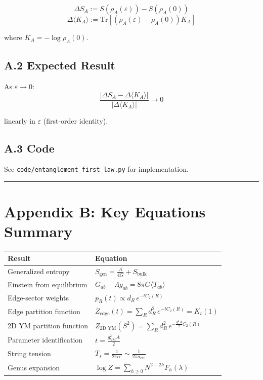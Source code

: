 \[\Delta S_A := S(\rho_A(\varepsilon)) - S(\rho_A(0))\] \[\Delta\langle K_A \rangle := \text{Tr}[(\rho_A(\varepsilon) - \rho_A(0)) K_A]\]

where \(K_A = -\log \rho_A(0)\).

\subsection{A.2 Expected Result}\label{a2-expected-result}

As \(\varepsilon \to 0\): \[\frac{|\Delta S_A - \Delta\langle K_A \rangle|}{|\Delta\langle K_A \rangle|} \to 0\]

linearly in \(\varepsilon\) (first-order identity).

\subsection{A.3 Code}\label{a3-code}

See \texttt{code/entanglement\_first\_law.py} for implementation.

\begin{center}\rule{0.5\linewidth}{0.5pt}\end{center}

\section{Appendix B: Key Equations Summary}\label{appendix-b-key-equations-summary}

{\def\LTcaptype{none} %
\begin{longtable}[]{@{}>{\RaggedRight\arraybackslash}p{}>{\RaggedRight\arraybackslash}p{}@{}}
\toprule\noalign{}
Result & Equation \\
\midrule\noalign{}
\endhead
\bottomrule\noalign{}
\endlastfoot
Generalized entropy & \(S_{\text{gen}} = \frac{A}{4G} + S_{\text{bulk}}\) \\
Einstein from equilibrium & \(G_{ab} + \Lambda g_{ab} = 8\pi G \langle T_{ab} \rangle\) \\
Edge-sector weights & \(p_R(t) \propto d_R \, e^{-t C_2(R)}\) \\
Edge partition function & \(Z_{\text{edge}}(t) = \sum_R d_R^2 \, e^{-t C_2(R)} = K_t(1)\) \\
2D YM partition function & \(Z_{\text{2D YM}}(S^2) = \sum_R d_R^2 \, e^{-\frac{g^2 A}{2} C_2(R)}\) \\
Parameter identification & \(t = \frac{g_{\text{YM}}^2 A}{2}\) \\
String tension & \(T_s = \frac{1}{2\pi\alpha'} \sim \frac{1}{2\pi a_{\text{cell}}}\) \\
Genus expansion & \(\log Z = \sum_{h \geq 0} N^{2-2h} F_h(\lambda)\) \\
\end{longtable}
}

